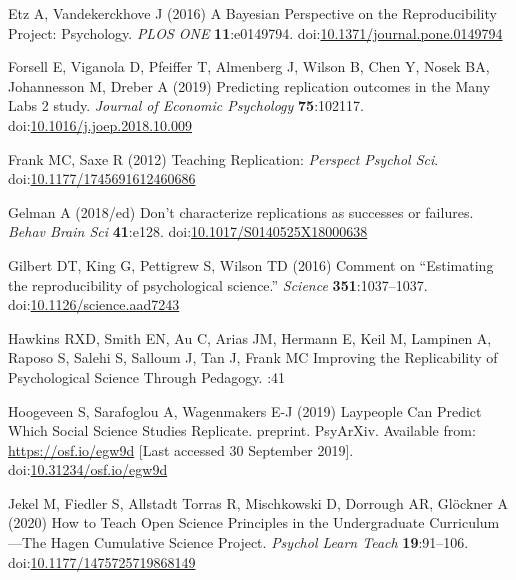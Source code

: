 \documentclass[
  english,
  a4paper,
]{article}
\newlength{\cslhangindent}
\newlength{\cslentryspacingunit} %
\newenvironment{CSLReferences}[2] %
 {%
  \setlength{\parindent}{0pt}
  \ifodd #1
  \let\oldpar\par
  \def\par{\hangindent=\cslhangindent\oldpar}
  \fi
  \setlength{\parskip}{#2\cslentryspacingunit}
 }%
 {}
\begin{document}
\begin{CSLReferences}{1}{0}
\leavevmode{}%
Etz A, Vandekerckhove J (2016) A {Bayesian Perspective} on the {Reproducibility Project}: {Psychology}. \emph{PLOS ONE} \textbf{11}:e0149794. doi:\href{https://doi.org/10.1371/journal.pone.0149794}{10.1371/journal.pone.0149794}

\leavevmode{}%
Forsell E, Viganola D, Pfeiffer T, Almenberg J, Wilson B, Chen Y, Nosek BA, Johannesson M, Dreber A (2019) Predicting replication outcomes in the {Many Labs} 2 study. \emph{Journal of Economic Psychology} \textbf{75}:102117. doi:\href{https://doi.org/10.1016/j.joep.2018.10.009}{10.1016/j.joep.2018.10.009}

\leavevmode{}%
Frank MC, Saxe R (2012) Teaching {Replication}: \emph{Perspect Psychol Sci}. doi:\href{https://doi.org/10.1177/1745691612460686}{10.1177/1745691612460686}

\leavevmode{}%
Gelman A (2018/ed) Don't characterize replications as successes or failures. \emph{Behav Brain Sci} \textbf{41}:e128. doi:\href{https://doi.org/10.1017/S0140525X18000638}{10.1017/S0140525X18000638}

\leavevmode{}%
Gilbert DT, King G, Pettigrew S, Wilson TD (2016) Comment on {``{Estimating} the reproducibility of psychological science.''} \emph{Science} \textbf{351}:1037--1037. doi:\href{https://doi.org/10.1126/science.aad7243}{10.1126/science.aad7243}

\leavevmode{}%
Hawkins RXD, Smith EN, Au C, Arias JM, Hermann E, Keil M, Lampinen A, Raposo S, Salehi S, Salloum J, Tan J, Frank MC Improving the {Replicability} of {Psychological Science Through Pedagogy}. :41

\leavevmode{}%
Hoogeveen S, Sarafoglou A, Wagenmakers E-J (2019) Laypeople {Can Predict Which Social Science Studies Replicate}. preprint. {PsyArXiv}. Available from: \url{https://osf.io/egw9d} {[}Last accessed 30 September 2019{]}. doi:\href{https://doi.org/10.31234/osf.io/egw9d}{10.31234/osf.io/egw9d}

\leavevmode{}%
Jekel M, Fiedler S, Allstadt Torras R, Mischkowski D, Dorrough AR, Glöckner A (2020) How to {Teach Open Science Principles} in the {Undergraduate Curriculum}---{The Hagen Cumulative Science Project}. \emph{Psychol Learn Teach} \textbf{19}:91--106. doi:\href{https://doi.org/10.1177/1475725719868149}{10.1177/1475725719868149}


\end{CSLReferences}
\end{document}
